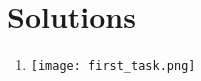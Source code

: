 \documentclass{article}
\begin{document}

\section*{Solutions}
\begin{enumerate}
    \item 
        \centering
        \texttt{[image: first\_task.png]} %

\end{enumerate}
\end{document}
